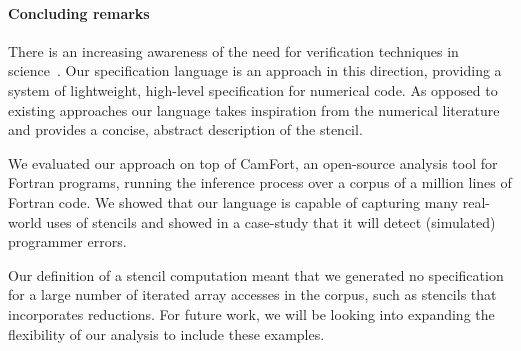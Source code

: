 \documentclass[10pt,preprint,numbers]{sigplanconf}
\theoremstyle{definition}
\begin{document}
\paragraph{Concluding remarks}

There is an increasing awareness of the need for verification
techniques in
science~\cite{post2005computational,oberkampf2010verification,orchard2014computational}.
Our specification language is an approach in this direction, providing
a system of lightweight, high-level specification for numerical code.
As opposed to existing approaches our language takes inspiration from
the numerical literature and provides a concise, abstract description
of the stencil.

We evaluated our approach on top of CamFort, an open-source analysis
tool for Fortran programs, running the inference process over a corpus
of a million lines of Fortran code. We showed that our language is
capable of capturing many real-world uses of stencils and showed in a
case-study that it will detect (simulated) programmer errors.

Our definition of a stencil computation meant that we generated no
specification for a large number of iterated array accesses in the
corpus, such as stencils that incorporates reductions. For
future work, we will be looking into expanding the flexibility of 
our analysis to include these examples. 


\end{document}
